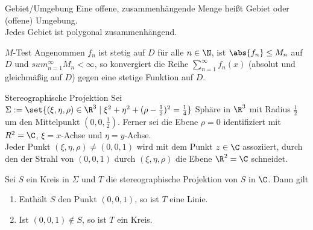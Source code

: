 \begin{karte}{Gebiet/Umgebung}
    Eine offene, zusammenhängende Menge heißt Gebiet oder 
    (offene) Umgebung.\\
    Jedes Gebiet ist polygonal zusammenhängend.
\end{karte}

\begin{karte}{\(M\)-Test}
    Angenommen \(f_n\) ist stetig auf \(D\) für alle \(n\in\N\), 
    ist \(\abs{f_n} \leq M_n\) auf \(D\) und \(sum_{n=1}^\infty M_n < \infty\), 
    so konvergiert die Reihe \(\sum_{n=1}^\infty f_n(x)\) (absolut und gleichmäßig auf \(D\)) 
    gegen eine stetige Funktion auf \(D\).
\end{karte}

\begin{karte}{Stereographische Projektion}
    Sei \(\Sigma := \set{ (\xi, \eta, \rho) \in \R^3 \;|\;\xi^2 + \eta^2 + (\rho - \frac{1}{2})^2 = \frac{1}{4} }\) Sphäre in \(\R^3\) 
    mit Radius \(\frac{1}{2}\) um den Mittelpunkt \((0,0,\frac{1}{2})\). 
    Ferner sei die Ebene \(\rho = 0\) identifiziert mit \(R^2 = \C\), \(\xi = x\)-Achse und \(\eta = y\)-Achse.\\
    Jeder Punkt \((\xi, \eta, \rho) \neq (0,0,1)\) wird mit dem Punkt \(z\in \C\) assoziiert, durch den der Strahl von \((0,0,1)\)
    durch \((\xi,\eta,\rho)\) die Ebene \(\R^2 = \C\) schneidet.

    Sei \(S\) ein Kreis in \(\Sigma\) und \(T\) die stereographische
    Projektion von \(S\) in \(\C\). Dann gilt 
    \begin{enumerate}
        \item Enthält \(S\) den Punkt \((0,0,1)\), so ist \(T\) eine Linie.
        \item Ist \((0,0,1) \notin S\), so ist \(T\) ein Kreis.
    \end{enumerate}
\end{karte}